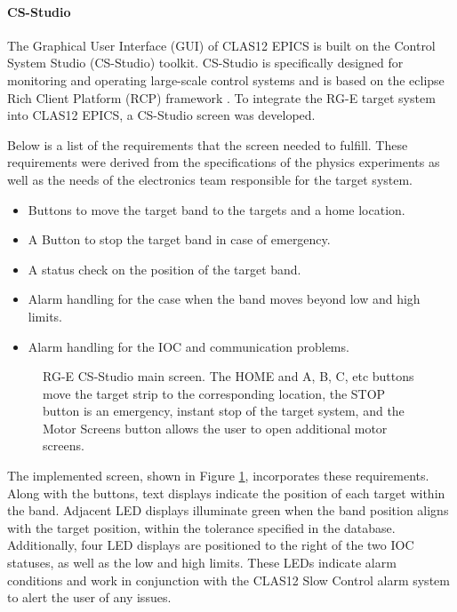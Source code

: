 \paragraph{CS-Studio}
\label{par::cs_studio}
    The Graphical User Interface (GUI) of CLAS12 EPICS is built on the Control System Studio (CS-Studio) toolkit.
    CS-Studio is specifically designed for monitoring and operating large-scale control systems and is based on the eclipse Rich Client Platform (RCP) framework \cite{kasemir2007}.
    To integrate the RG-E target system into CLAS12 EPICS, a CS-Studio screen was developed.

    Below is a list of the requirements that the screen needed to fulfill.
    These requirements were derived from the specifications of the physics experiments as well as the needs of the electronics team responsible for the target system.

    \begin{itemize}
        \item
            Buttons to move the target band to the targets and a home location.
        \item
            A Button to stop the target band in case of emergency.
        \item
            A status check on the position of the target band.
        \item
            Alarm handling for the case when the band moves beyond low and high limits.
        \item
            Alarm handling for the IOC and communication problems.
    \end{itemize}

    \begin{figure}[b!]
        \centering{}
        \caption[RG-E CS-Studio main screen]{RG-E CS-Studio main screen. The HOME and A, B, C, etc buttons move the target strip to the corresponding location, the STOP button is an emergency, instant stop of the target system, and the Motor Screens button allows the user to open additional motor screens.}
        \label{fig::rge_motorx}
    \end{figure}

The implemented screen, shown in Figure \ref{fig::rge_motorx}, incorporates these requirements.
    Along with the buttons, text displays indicate the position of each target within the band.
    Adjacent LED displays illuminate green when the band position aligns with the target position, within the tolerance specified in the database.
    Additionally, four LED displays are positioned to the right of the two IOC statuses, as well as the low and high limits.
    These LEDs indicate alarm conditions and work in conjunction with the CLAS12 Slow Control alarm system to alert the user of any issues.

